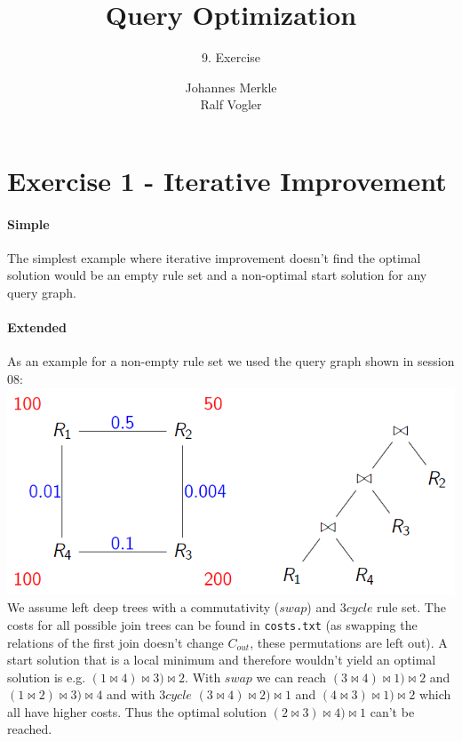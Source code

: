 \documentclass[11pt,a4paper]{scrartcl}
\begin{document}
\author{Johannes Merkle\\Ralf Vogler}
\title{Query Optimization}
\subtitle{9. Exercise}

\maketitle

\section*{Exercise 1 - Iterative Improvement}
\paragraph*{Simple}
The simplest example where iterative improvement doesn't find the optimal solution would be an empty rule set and a non-optimal start solution for any query graph.

\paragraph*{Extended}
As an example for a non-empty rule set we used the query graph shown in session 08:\\
\includegraphics[scale=.8]{graph-and-tree}\\
We assume left deep trees with a commutativity ($swap$) and $3cycle$  rule set.
The costs for all possible join trees can be found in \verb|costs.txt| (as swapping the relations of the first join doesn't change $C_{out}$, these permutations are left out).
A start solution that is a local minimum and therefore wouldn't yield an optimal solution is e.g. $(1 \Join 4)\Join 3)\Join 2$. With $swap$ we can reach $(3 \Join 4)\Join 1)\Join 2$ and $(1 \Join 2)\Join 3)\Join 4$ and with $3cycle$ $(3 \Join 4)\Join 2)\Join 1$ and $(4 \Join 3)\Join 1)\Join 2$ which all have higher costs. Thus the optimal solution $(2 \Join 3)\Join 4)\Join 1$ can't be reached.



\end{document}
